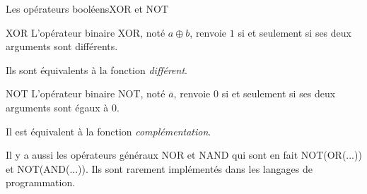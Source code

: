 \begin{frame}{Les opérateurs booléens}{XOR et NOT} 
 \begin{block}{XOR}
    L'opérateur binaire XOR, noté $a\oplus b$, renvoie $1$ si et seulement si ses deux arguments sont différents.

    Ils sont équivalents à la fonction \emph{différent}.
  \end{block}
  \begin{block}{NOT}
    L'opérateur binaire NOT, noté $\overline{a}$, renvoie $0$ si et seulement si ses deux arguments sont égaux à $0$.

    Il est équivalent à la fonction \emph{complémentation}.

    Il y a aussi les opérateurs généraux NOR et NAND qui sont en fait
    NOT(OR(...)) et NOT(AND(...)). Ils sont rarement implémentés dans
    les langages de programmation.
  \end{block}
\end{frame}

